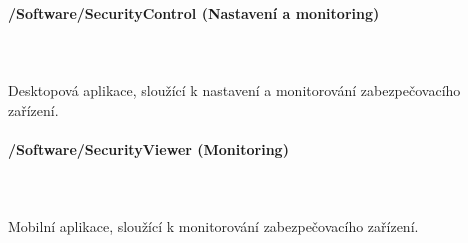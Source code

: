 \documentclass[FM,MP]{tulthesis}  %
\begin{document}
\paragraph{/Software/SecurityControl (Nastavení a monitoring)}\mbox{}\\\mbox{}\\
Desktopová aplikace, sloužící k nastavení a monitorování zabezpečovacího zařízení.

\paragraph{/Software/SecurityViewer (Monitoring)}\mbox{}\\\mbox{}\\
Mobilní aplikace, sloužící k monitorování zabezpečovacího zařízení.
\end{document}
